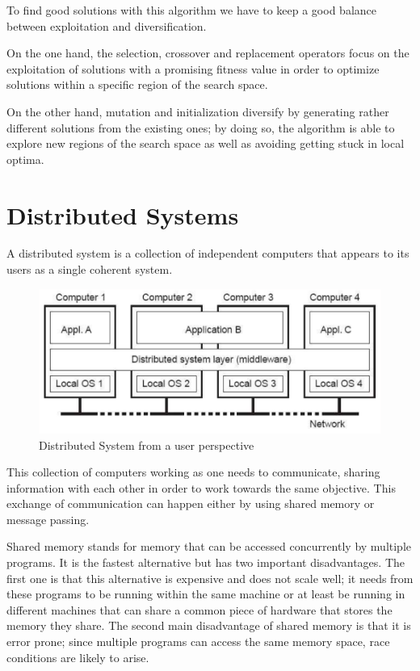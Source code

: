 To find good solutions with this algorithm we have to keep a good balance between exploitation and diversification. 

On the one hand, the selection, crossover and replacement operators focus on the exploitation of solutions with a promising fitness value in order to optimize solutions within a specific region of the search space. 

On the other hand, mutation and initialization diversify by generating rather different solutions from the existing ones; by doing so, the algorithm is able to explore new regions of the search space as well as avoiding getting stuck in local optima.

\section{Distributed Systems}
A distributed system is a collection of independent computers that appears to its users as a single coherent system.

\begin{figure}[h!]
\centering
    \includegraphics[scale=0.3]{assets/images/distributed-system_diagram.png}
    \caption{Distributed System from a user perspective}
    \label{fig:distributed_system}
\end{figure}

This collection of computers working as one needs to communicate, sharing information with each other in order to work towards the same objective. This exchange of communication can happen either by using shared memory or message passing.

Shared memory stands for memory that can be accessed concurrently by multiple programs. It is the fastest alternative but has two important disadvantages. The first one is that this alternative is expensive and does not scale well; it needs from these programs to be running within the same machine or at least be running in different machines that can share a common piece of hardware that stores the memory they share. The second main disadvantage of shared memory is that it is error prone; since multiple programs can access the same memory space, race conditions are likely to arise.

